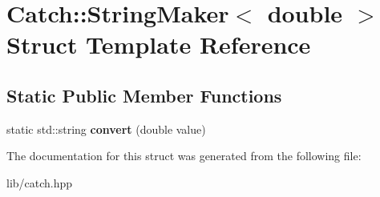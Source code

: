 \hypertarget{struct_catch_1_1_string_maker_3_01double_01_4}{}\section{Catch\+:\+:String\+Maker$<$ double $>$ Struct Template Reference}
\label{struct_catch_1_1_string_maker_3_01double_01_4}
\subsection*{Static Public Member Functions}
\begin{DoxyCompactItemize}
\item 
\mbox{\label{struct_catch_1_1_string_maker_3_01double_01_4_acaa61529acad2462292c747d34e5f3d2}} 
static std\+::string {\bfseries convert} (double value)
\end{DoxyCompactItemize}


The documentation for this struct was generated from the following file\+:\begin{DoxyCompactItemize}
\item 
lib/catch.\+hpp\end{DoxyCompactItemize}
